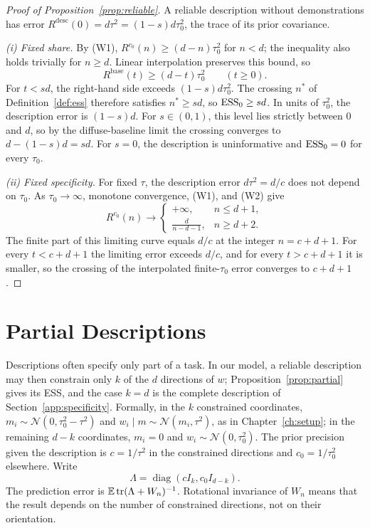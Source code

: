 \begin{proof}[Proof of Proposition~\ref{prop:reliable}]
A reliable description without demonstrations has error $R^{\mathrm{desc}}(0)=d\tau^2=(1-s)d\tau_0^2$, the trace of its prior covariance.

\emph{(i) Fixed share.}
By (W1), $R^{c_0}(n)\ge(d-n)\tau_0^2$ for $n<d$; the inequality also holds trivially for $n\ge d$. Linear interpolation preserves this bound, so
\[
R^{\mathrm{base}}(t)\ge(d-t)\tau_0^2\qquad(t\ge0).
\]
For $t<sd$, the right-hand side exceeds $(1-s)d\tau_0^2$. The crossing $n^*$ of Definition~\ref{def:ess} therefore satisfies $n^*\ge sd$, so $\mathrm{ESS}_0\ge sd$. In units of $\tau_0^2$, the description error is $(1-s)d$. For $s\in(0,1)$, this level lies strictly between $0$ and $d$, so by the diffuse-baseline limit the crossing converges to $d-(1-s)d=sd$. For $s=0$, the description is uninformative and $\mathrm{ESS}_0=0$ for every $\tau_0$.

\emph{(ii) Fixed specificity.}
For fixed $\tau$, the description error $d\tau^2=d/c$ does not depend on $\tau_0$. As $\tau_0\to\infty$, monotone convergence, (W1), and (W2) give
\[
R^{c_0}(n)\longrightarrow
\begin{cases}
+\infty,&n\le d+1,\\[2pt]
\displaystyle\frac{d}{n-d-1},&n\ge d+2.
\end{cases}
\]
The finite part of this limiting curve equals $d/c$ at the integer $n=c+d+1$. For every $t<c+d+1$ the limiting error exceeds $d/c$, and for every $t>c+d+1$ it is smaller, so the crossing of the interpolated finite-$\tau_0$ error converges to $c+d+1$.
\end{proof}

\section{Partial Descriptions}\label{app:partial}

Descriptions often specify only part of a task. In our model, a reliable description may then constrain only $k$ of the $d$ directions of $w$; Proposition~\ref{prop:partial} gives its ESS, and the case $k=d$ is the complete description of Section~\ref{app:specificity}. Formally, in the $k$ constrained coordinates, $m_i\sim\mathcal N(0,\tau_0^2-\tau^2)$ and $w_i\mid m\sim\mathcal N(m_i,\tau^2)$, as in Chapter~\ref{ch:setup}; in the remaining $d-k$ coordinates, $m_i=0$ and $w_i\sim\mathcal N(0,\tau_0^2)$. The prior precision given the description is $c=1/\tau^2$ in the constrained directions and $c_0=1/\tau_0^2$ elsewhere. Write
\[
\Lambda=\operatorname{diag}(cI_k,c_0I_{d-k}).
\]
The prediction error is $\mathbb{E}\operatorname{tr}(\Lambda+W_n)^{-1}$. Rotational invariance of $W_n$ means that the result depends on the number of constrained directions, not on their orientation.

